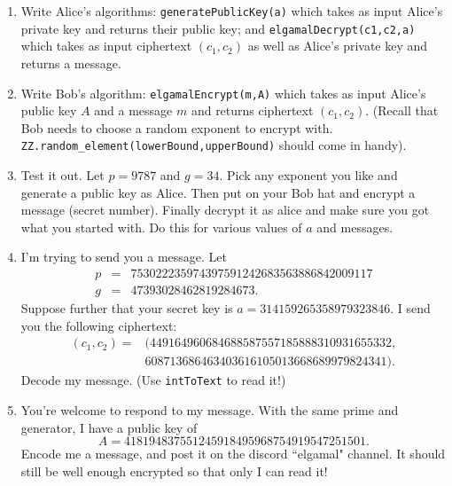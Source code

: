 \documentclass[11pt]{article}
\begin{document}
\begin{enumerate}
{  \begin{enumerate}
    \item{
    Write Alice's algorithms: \verb|generatePublicKey(a)| which takes as input Alice's private key and returns their public key; and \verb|elgamalDecrypt(c1,c2,a)| which takes as input ciphertext $(c_1,c_2)$ as well as Alice's private key and returns a message.
    }
    \item{
    Write Bob's algorithm: \verb|elgamalEncrypt(m,A)| which takes as input Alice's public key $A$ and a message $m$ and returns ciphertext $(c_1,c_2)$.  (Recall that Bob needs to choose a random exponent to encrypt with.  \verb|ZZ.random_element(lowerBound,upperBound)| should come in handy).
    }
    \item{
    Test it out.  Let $p=9787$ and $g=34$.  Pick any exponent you like and generate a public key as Alice.  Then put on your Bob hat and encrypt a message (secret number).  Finally decrypt it as alice and make sure you got what you started with.  Do this for various values of $a$ and messages.
    }
    \item{
    I'm trying to send you a message.  Let
    \begin{eqnarray*}
      p&=&753022235974397591242683563886842009117\\
      g&=&47393028462819284673.
    \end{eqnarray*}
    Suppose further that your secret key is $a=314159265358979323846$.  I send you the following ciphertext:
    \begin{eqnarray*}(c_1,c_2) =& (449164960684688587557185888310931655332,\\
      &608713686463403616105013668689979824341).
    \end{eqnarray*}
    Decode my message. (Use \verb|intToText| to read it!)
    }
    \item{
    You're welcome to respond to my message.  With the same prime and generator, I have a public key of
    \[A = 418194837551245918495968754919547251501.\]
    Encode me a message, and post it on the discord ``elgamal" channel.  It should still be well enough encrypted so that only I can read it!
    }
  \end{enumerate}
  }
\end{enumerate}
\newpage
\end{document}
